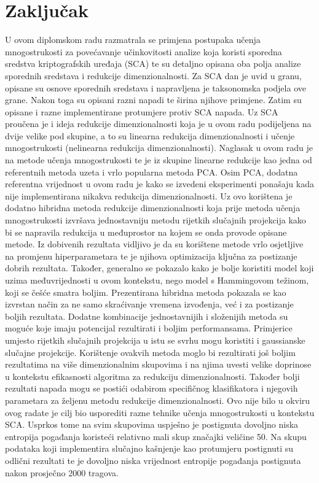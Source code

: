 \documentclass[times, utf8, diplomski]{fer}
\begin{document}
\chapter{Zaključak}
U ovom diplomskom radu razmatrala se primjena postupaka učenja mnogostrukosti za povećavanje učinkovitosti analize koja koristi sporedna sredstva kriptografskih uređaja (SCA) te su detaljno opisana oba polja analize sporednih sredstava i redukcije dimenzionalnosti. Za SCA dan je uvid u granu, opisane su osnove sporednih sredstava i napravljena je taksonomska podjela ove grane. Nakon toga su opisani razni napadi te širina njihove primjene. Zatim su opisane i razne implementirane protumjere protiv SCA napada. Uz SCA proučena je i ideja redukcije dimenzionalnosti koja je u ovom radu podijeljena na dvije velike pod skupine, a to su linearna redukcija dimenzionalnosti i učenje mnogostrukosti (nelinearna redukcija dimenzionalnosti). Naglasak u ovom radu je na metode učenja mnogostrukosti te je iz skupine linearne redukcije kao jedna od referentnih metoda uzeta i vrlo popularna metoda PCA. Osim PCA, dodatna referentna vrijednost u ovom radu je kako se izvedeni eksperimenti ponašaju kada nije implementirana nikakva redukcija dimenzionalnosti. Uz ovo korištena je dodatno hibridna metoda redukcije dimenzionalnosti koja prije metoda učenja mnogostrukosti izvršava jednostavniju metodu rijetkih slučajnih projekcija kako bi se napravila redukcija u međuprostor na kojem se onda provode opisane metode. Iz dobivenih rezultata vidljivo je da su korištene metode vrlo osjetljive na promjenu hiperparametara te je njihova optimizacija ključna za postizanje dobrih rezultata. Također, generalno se pokazalo kako je bolje koristiti model koji uzima međuvrijednosti u ovom kontekstu, nego model s Hammingovom težinom, koji se češće smatra boljim. Prezentirana hibridna metoda pokazala se kao izvrstan način za ne samo skraćivanje vremena izvođenja, već i za postizanje boljih rezultata. Dodatne kombinacije jednostavnijih i složenijih metoda su moguće koje imaju potencijal rezultirati i boljim performansama. Primjerice umjesto rijetkih slučajnih projekcija u istu se svrhu mogu koristiti i gaussianske slučajne projekcije. Korištenje ovakvih metoda moglo bi rezultirati još boljim rezultatima na više dimenzionalnim skupovima i na njima uvesti velike doprinose u kontekstu efikasnosti algoritma za redukciju dimenzionalnosti. Također bolji rezultati napada mogu se postići odabirom specifičnog klasifikatora i njegovih parametara za željenu metodu redukcije dimenzionalnosti. Ovo nije bilo u okviru ovog radate je cilj bio usporediti razne tehnike učenja mnogostrukosti u kontekstu SCA. Usprkos tome na svim skupovima uspješno je postignuta dovoljno niska entropija pogađanja koristeći relativno mali skup značajki veličine 50. Na skupu podataka koji implementira slučajno kašnjenje kao protumjeru postignuti su odlični rezultati te je dovoljno niska vrijednost entropije pogađanja postignuta nakon prosječno 2000 tragova.
\end{document}

